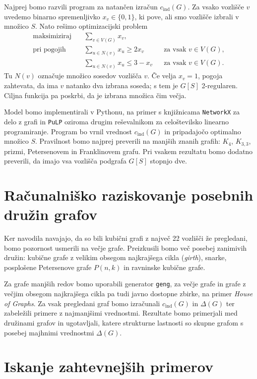 \documentclass[11pt,a4paper]{article}
\begin{document}
Najprej bomo razvili program za natančen izračun $c_{\mathrm{ind}}(G)$. Za vsako vozlišče $v$ uvedemo binarno spremenljivko
$x_v\in\{0,1\}$, ki pove, ali smo vozlišče izbrali v množico $S$. Nato rešimo optimizacijski problem
\begin{align*}
    \text{maksimiziraj}\quad & \sum_{v\in V(G)}x_v,\\[-2pt]
    \text{pri pogojih}\quad & \sum_{u\in N(v)}x_u\geq 2x_v
    &&\text{za vsak }v\in V(G),\\[-2pt]
    & \sum_{u\in N(v)}x_u\leq 3-x_v
    &&\text{za vsak }v\in V(G).
\end{align*}
Tu $N(v)$ označuje množico sosedov vozlišča $v$. Če velja $x_v=1$, pogoja zahtevata, da ima $v$
natanko dva izbrana soseda; s tem je $G[S]$ 2-regularen. Ciljna funkcija pa poskrbi, da je
izbrana množica čim večja.

Model bomo implementirali v Pythonu, na primer s knjižnicama \texttt{NetworkX} za delo z grafi in
\texttt{PuLP} oziroma drugim reševalnikom za celoštevilsko linearno programiranje. Program bo vrnil vrednost $c_{\mathrm{ind}}(G)$ in pripadajočo
optimalno množico $S$. Pravilnost bomo najprej preverili na manjših znanih grafih: $K_4$, $K_{3,3}$, prizmi, Petersenovem
in Franklinovem grafu. Pri vsakem rezultatu bomo dodatno preverili, da imajo vsa vozlišča podgrafa $G[S]$
stopnjo dve.

\section{Računalniško raziskovanje posebnih družin grafov}

Ker navodila navajajo, da so bili kubični grafi z največ 22 vozlišči že pregledani, bomo pozornost
usmerili na večje grafe. Preizkusili bomo več posebej zanimivih družin: kubične grafe z velikim obsegom
najkrajšega cikla (\emph{girth}), snarke, posplošene Petersenove grafe $P(n,k)$ in ravninske kubične grafe.

Za grafe manjših redov bomo uporabili generator \texttt{geng},
za večje grafe in grafe z večjim obsegom najkrajšega cikla pa tudi javno dostopne zbirke,
na primer \emph{House of Graphs}. Za vsak pregledani graf bomo izračunali $c_{\mathrm{ind}}(G)$ in $\Delta(G)$ ter
zabeležili primere z najmanjšimi vrednostmi. Rezultate bomo primerjali med družinami grafov in ugotavljali, katere strukturne
lastnosti so skupne grafom s posebej majhnimi vrednostmi $\Delta(G)$.

\section{Iskanje zahtevnejših primerov}
\end{document}
